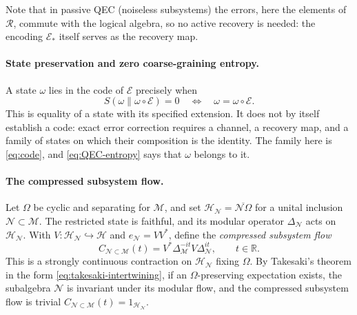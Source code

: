 \documentclass[a4paper,11pt]{article}
\theoremstyle{definition}
\newcommand{\mR}{\mathcal{R}}
\newcommand{\mN}{\mathcal{N}}
\newcommand{\mH}{\mathcal{H}}
\newcommand{\mM}{\mathcal{M}}
\newcommand{\mE}{\mathcal{E}}
\begin{document}
Note that in passive QEC (noiseless subsystems) the errors, here the elements of $\mR$, commute with the logical algebra, so no active recovery is needed: the encoding $\mE_*$ itself serves as the recovery map.

\paragraph{State preservation and zero coarse-graining entropy.}
A state $\omega$ lies in the code of $\mE$ precisely when
\begin{equation}
 S(\omega\|\omega\circ\mE)=0\quad\Longleftrightarrow\quad\omega=\omega\circ\mE .
 \label{eq:QEC-entropy}
\end{equation}
This is equality of a state with its specified extension. It does not by itself establish a code: exact error correction requires a channel, a recovery map, and a family of states on which their composition is the identity. The family here is \eqref{eq:code}, and \eqref{eq:QEC-entropy} says that $\omega$ belongs to it.

\paragraph{The compressed subsystem flow.}
Let $\Omega$ be cyclic and separating for $\mM$, and set
$\mH_{\mN}=\overline{\mN\Omega}$ for a unital inclusion $\mN\subset\mM$.
The restricted state is faithful, and its modular operator $\Delta_{\mN}$ acts on
$\mH_{\mN}$. With $V:\mH_{\mN}\hookrightarrow\mathcal H$ and $e_{\mN}=VV^*$,
define the {\it compressed subsystem flow}
\begin{equation}
 C_{\mN\subset\mM}(t)=V^*\Delta_{\mM}^{-it}V\Delta_{\mN}^{it},
 \qquad t\in\mathbb R.
\end{equation}
This is a strongly continuous contraction on $\mH_{\mN}$ fixing $\Omega$. By Takesaki's theorem in the form \eqref{eq:takesaki-intertwining}, if an $\Omega$-preserving expectation exists, the subalgebra $\mN$ is invariant under its modular flow, and the compressed subsystem flow is trivial
$C_{\mN\subset\mM}(t)=1_{\mH_{\mN}}$.
\end{document}
